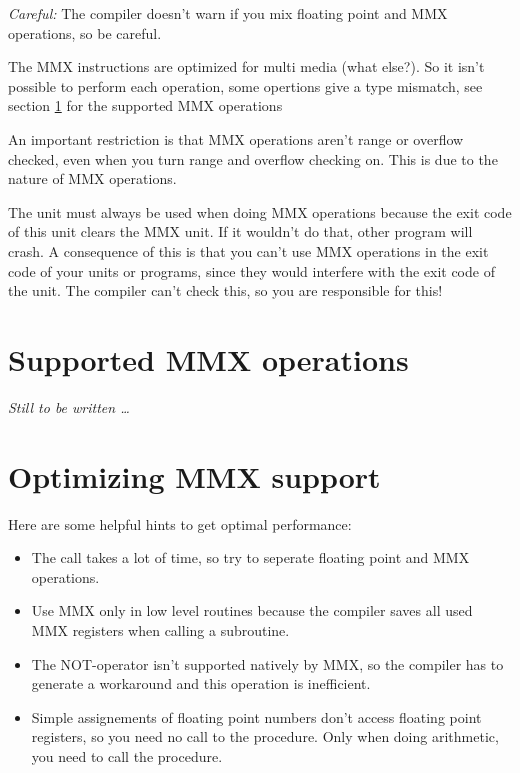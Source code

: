 {\em Careful:} The compiler doesn't warn if you mix floating point and
MMX operations, so be careful.

The MMX instructions are optimized for multi media (what else?).
So it isn't possible to perform each operation, some opertions
give a type mismatch, see section \ref {se:SupportedMMX} for the supported
MMX operations

An important restriction is that MMX operations aren't range or overflow
checked, even when you turn range and overflow checking on. This is due to
the nature of MMX operations.

The  unit must always be used when doing MMX operations
because the exit code of this unit clears the MMX unit. If it wouldn't do
that, other program will crash. A consequence of this is that you can't use
MMX operations in the exit code of your units or programs, since they would
interfere  with the exit code of the  unit. The compiler can't
check this, so you are responsible for this!

\section{Supported MMX operations}
\label{se:SupportedMMX}

{\em Still to be written \dots}

\section{Optimizing MMX support}
\label{se:OptimizingMMX}
Here are some helpful hints to get optimal performance:
\begin{itemize}
\item The  call takes a lot of time, so try to seperate floating
point and MMX operations.
\item Use MMX only in low level routines because the compiler
  saves all used MMX registers when calling a subroutine.
\item The NOT-operator isn't supported natively by MMX, so the
  compiler has to generate a workaround and this operation
  is inefficient.
\item Simple assignements of floating point numbers don't access
  floating point registers, so you need no call to the 
  procedure. Only when doing arithmetic, you need to call the 
procedure.
\end{itemize}


